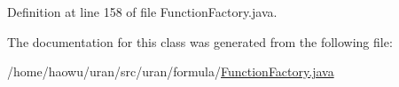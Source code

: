 Definition at line 158 of file Function\+Factory.\+java.



The documentation for this class was generated from the following file\+:\begin{DoxyCompactItemize}
\item 
/home/haowu/uran/src/uran/formula/\hyperlink{_function_factory_8java}{Function\+Factory.\+java}\end{DoxyCompactItemize}
